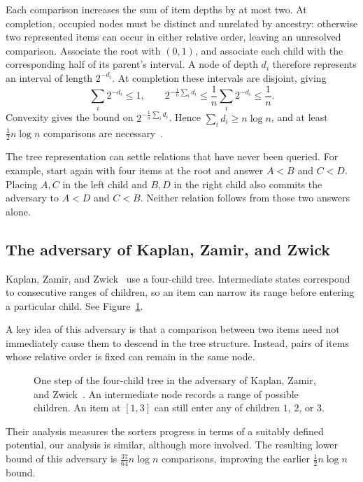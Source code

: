 Each comparison increases the sum of item depths by at most two.
At completion, occupied nodes must be distinct and unrelated by ancestry:
otherwise two represented items can occur in either relative order, leaving
an unresolved comparison. Associate the root with $(0,1)$, and associate
each child with the corresponding half of its parent's interval.
A node of depth $d_i$ therefore represents an interval of length $2^{-d_i}$.
At completion these intervals are disjoint, giving
\[
\sum_i2^{-d_i}\le1,
\qquad
2^{-\frac1n\sum_i d_i}\le\frac1n\sum_i2^{-d_i}\le\frac1n.
\]
Convexity gives the bound on $2^{-\frac1n\sum_i d_i}$. Hence $\sum_i d_i\ge n\log n$, and
at least $\tfrac12 n\log n$ comparisons are
necessary~\cite[Section~4.1]{brodal}.

The tree representation can settle relations that have never been queried.
For example, start again with four items at the root and answer $A<B$ and
$C<D$. Placing $A,C$ in the left child and $B,D$ in the right child also
commits the adversary to $A<D$ and $C<B$. Neither relation follows from
those two answers alone.

\subsection{The adversary of Kaplan, Zamir, and Zwick}

Kaplan, Zamir, and Zwick~\cite{kzz} use a four-child tree. Intermediate
states correspond to consecutive ranges of children, so an item can
narrow its range before entering a particular child. See Figure~\ref{fig:kzz-lattice}.

A key idea of this adversary is that a comparison between two items need not immediately cause them
to descend in the tree structure. Instead, pairs of items whose relative order is fixed can remain in the
same node.

\begin{figure}[htbp]
\centering
{}
\caption{One step of the four-child tree in the adversary of Kaplan,
Zamir, and Zwick~\cite[Section~5]{kzz}. An intermediate node records a
range of possible children. An item at $[1,3]$ can still enter any of
children $1$, $2$, or $3$.}
\label{fig:kzz-lattice}
\end{figure}

Their analysis measures the sorters progress in terms of a suitably defined potential, our analysis is similar, although more involved.
The resulting lower bound of this adversary is $\frac{37}{64}n\log n$ comparisons, improving the earlier
$\frac12 n\log n$ bound.
